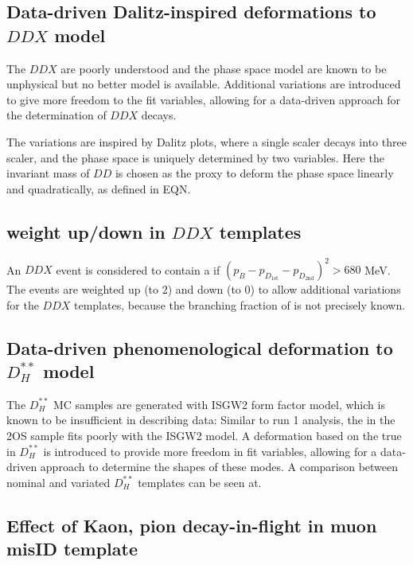 \subsection{Data-driven Dalitz-inspired deformations to $DDX$ model}
\label{ref:fit:var:ddx}

The $DDX$ are poorly understood and the phase space model are known to be
unphysical but no better model is available.
Additional variations are introduced to give more freedom to the fit variables,
allowing for a data-driven approach for the determination of $DDX$ decays.

The variations are inspired by Dalitz plots, where a single scaler decays into
three scaler, and the phase space is uniquely determined by two variables.
Here the invariant mass of $DD$ is chosen as the proxy to deform the phase
space linearly and quadratically, as defined in EQN.


\subsection{\Kstar weight up/down in $DDX$ templates}

An $DDX$ event is considered to contain a \Kstar if
$(p_B - p_{D_\text{1st}} - p_{D_\text{2nd}})^2 > 680$ MeV.
The \Kstar events are weighted up (to 2) and down (to 0) to allow additional
variations for the $DDX$ templates, because the
branching fraction of \Kstar is not precisely known.


\subsection{Data-driven phenomenological deformation to $D_H^{**}$ model}

The $D_H^{**}$ MC samples are generated with ISGW2 form factor model, which
is known to be insufficient in describing data:
Similar to run 1 analysis, the \qSq in the 2OS sample fits poorly with the ISGW2
model.
A deformation based on the true \qSq
in $D_H^{**}$ is introduced to provide more freedom in fit variables,
allowing for a data-driven approach to determine the shapes of these modes.
A comparison between nominal and variated $D_H^{**}$ templates can be seen at.


\subsection{Effect of Kaon, pion decay-in-flight in muon misID template}
\label{ref:fit:tmpl:misid:dif}

